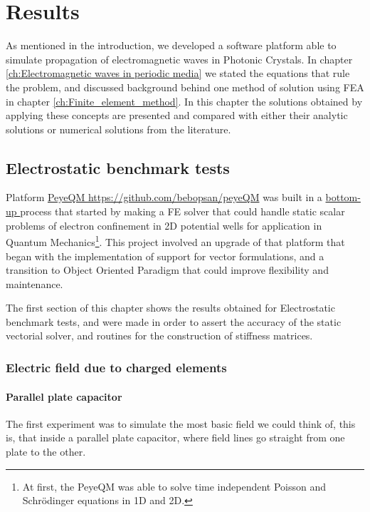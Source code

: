 \chapter{Results}
\label{ch:Results}
As mentioned in the introduction, we developed a software platform able to simulate propagation of electromagnetic waves in Photonic Crystals. In chapter \ref{ch:Electromagnetic waves in periodic media} we stated the equations that rule the problem, and discussed background behind one method of solution using FEA in chapter \ref{ch:Finite_element_method}. In this chapter the solutions obtained by applying these concepts are presented and compared with either their analytic solutions or numerical solutions from the literature.

\section{Electrostatic benchmark tests}

 Platform \href{https://github.com/bebopsan/peyeQM}{PeyeQM } \url{https://github.com/bebopsan/peyeQM}  was built in a \href{https://en.wikipedia.org/wiki/Top-down_and_bottom-up_design}{bottom-up } process that started by making a FE solver that could handle static scalar problems of electron confinement in 2D potential wells for application in Quantum Mechanics\footnote{At first, the PeyeQM was able to solve time independent Poisson and Schrödinger equations in 1D and 2D.}. This project involved an upgrade of that platform that began with the implementation of support for vector formulations, and a transition to Object Oriented Paradigm that could improve flexibility and maintenance.

The first section of this chapter shows the results obtained for Electrostatic benchmark tests, and were made in order to assert the accuracy of the static vectorial solver, and  routines for the construction of stiffness matrices.

\subsection{Electric field due to charged elements}
\subsubsection{Parallel plate capacitor}
The first experiment was to simulate the most basic field we could think of, this is, that inside a parallel plate capacitor, where field lines go straight from one plate to the other. 


